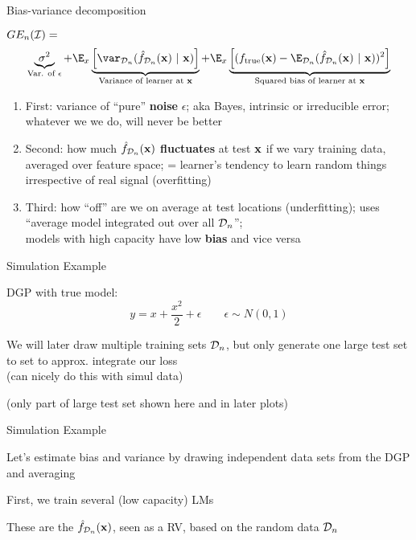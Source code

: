 \documentclass[11pt,compress,t,notes=noshow, xcolor=table]{beamer}
\begin{document}
\begin{frame}{Bias-variance decomposition}


$GE_n(\mathcal{I}) =$  
$$
\underbrace{\sigma^2}_{\text{Var. of $\epsilon$}} + \E_{x}\underbrace{\left[\var_{\D_n}(\fh_{\D_n}(\xv) ~|~\xv)\right]}_{\text{Variance of learner at } \xv} + \E_{x}\underbrace{\left[(\ftrue(\xv)-\E_{\D_n}(\fh_{\D_n}(\xv)~|~\xv))^2\right]}_{\text{Squared bias of learner at } \xv}  
$$

\begin{enumerate}
\item First: variance of ``pure''
\textbf{noise} $\epsilon$; aka Bayes, intrinsic or irreducible error; 
whatever we we do, will never be better
\item Second: how much \textbf{$\hat{f}_{\mathcal{D}_n}(\mathbf{x})$ fluctuates} at test $\mathbf{x}$ if we vary training data, averaged over feature space; = learner's tendency to learn random things irrespective of real signal (overfitting)

\item Third: how ``off'' are we on average at test locations (underfitting); uses ``average model integrated out over all $\mathcal{D}_n$''; \\
models with high capacity have low \textbf{bias} and vice versa
\end{enumerate}


\end{frame} 

\begin{framei}[sep=L]{Simulation Example}

\item DGP with true model:
$$y = x + \frac{x^2}{2} + \epsilon  \qquad \epsilon \sim 
N (0, 1)$$
\item We will later draw multiple training sets $\mathcal{D}_n$, but only generate one
large test set to set to approx. integrate our loss\\
(can nicely do this with simul data)


(only part of large test set shown here and in later plots)
\end{framei} 


\begin{framei}[sep=M]{Simulation Example}

\item Let's estimate bias and variance by drawing independent data sets from the DGP and averaging


\item First, we train several (low capacity) LMs
\item These are the $\hat{f}_{\mathcal{D}_n}(\mathbf{x})$, seen as a RV, based on the random
data $\mathcal{D}_n$

\hfill

\splitVCC
{}
{}

\end{framei} 
\end{document}
